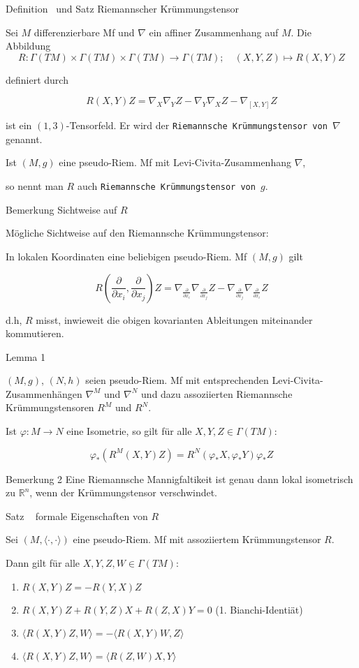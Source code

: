 \documentclass[a6paper,11pt,grid=front]{kartei}
\newcommand{\fl}[1]{\begin{flushleft}
 #1 \end{flushleft}}
\newcommand{\R}{\mathbb{R}}
\newcommand{\pd}[1][x_i]{\frac{\partial}{\partial {#1}}}
\newcommand{\blf}[1]{\langle #1 \rangle}
\newcounter{def}
\newcounter{satz}
\newcommand{\thisdef}{\thedef\ \stepcounter{def}}
\newcommand{\thissatz}{\thesatz\ \stepcounter{satz}}
\begin{document}

\nonameyet
{Definition \thisdef und Satz} {\small Riemannscher Krümmungstensor}
{
\small
Sei $M$ differenzierbare Mf und $\nabla$ ein affiner Zusammenhang auf $M$.
Die Abbildung  
\[
R : \Gamma(TM) \times \Gamma(TM) \times \Gamma(TM) \to \Gamma(TM); 
\quad (X,Y,Z) \mapsto R(X,Y)Z
\]
\fl{definiert durch}
\[
R(X,Y)Z = \nabla_X \nabla_Y Z - \nabla_Y \nabla_X Z - \nabla_{[X,Y]} Z
\]
\fl{ist ein $(1,3)$-Tensorfeld. Er wird der 
\texttt{Riemannsche Krümmungstensor von $\nabla$} genannt.}
Ist $(M,g)$ eine pseudo-Riem. Mf mit Levi-Civita-Zusammenhang $\nabla$,
\fl{so nennt man $R$ auch \texttt{Riemannsche Krümmungstensor von $g$}.}
}
{}

\nonameyet
{Bemerkung} {\small Sichtweise auf $R$}
{
Mögliche Sichtweise auf den Riemannsche Krümmungstensor:
\fl{In lokalen Koordinaten eine beliebigen pseudo-Riem. Mf $(M,g)$ gilt}
\[
R(\pd[x_i],\pd[x_j])Z = \nabla_{\pd[x_i]}\nabla_{\pd[x_j]} Z - 
\nabla_{\pd[x_j]}\nabla_{\pd[x_i]} Z
\]
\fl{d.h, $R$ misst, inwieweit die obigen kovarianten Ableitungen miteinander 
kommutieren.}
}
{}

\nonameyet
{Lemma 1} {}
{
\small
$(M,g)$, $(N,h)$ seien pseudo-Riem. Mf mit entsprechenden 
Levi-Civita-Zusammenhängen $\nabla^M$ und $\nabla^N$ und dazu
assoziierten Riemannsche Krümmungstensoren $R^M$ und $R^N$.
\fl{Ist $\varphi: M \to N$ eine Isometrie, so gilt für alle 
$X,Y,Z \in \Gamma(TM)$:}
\[
\varphi_* (R^M(X,Y)Z) = R^N (\varphi_* X, \varphi_* Y) \varphi_* Z
\]
}
{}

\nonameyet
{Bemerkung 2} {}
{
Eine Riemannsche Mannigfaltikeit ist genau dann lokal isometrisch zu $\R^n$,
wenn der Krümmungstensor verschwindet.
}
{}

\nonameyet
{Satz \thissatz} {formale Eigenschaften von $R$}
{
\small
Sei $(M,\blf{\cdot,\cdot})$ eine pseudo-Riem. Mf mit assoziiertem 
Krümmungstensor $R$.
\fl{Dann gilt für alle $X,Y,Z,W \in \Gamma(TM)$:}
\begin{enumerate}[1.]
\item $R(X,Y)Z = -R(Y,X)Z$
\item $R(X,Y)Z + R(Y,Z)X + R(Z,X)Y  = 0$ \hfill (1. Bianchi-Identiät)
\item $\blf{R(X,Y)Z,W} = -\blf{R(X,Y)W,Z}$ 
\item $\blf{R(X,Y)Z,W} = \blf{R(Z,W)X,Y}$
\end{enumerate}
}
{}
\end{document}
